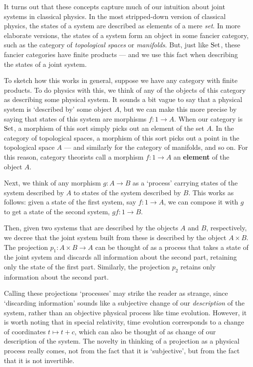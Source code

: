\documentclass[12pt]{article}
\newcommand{\Set}{{\rm Set}}
\renewcommand{\to}{\rightarrow}
\newcommand{\maps}{\colon}
\begin{document}
It turns out that these concepts capture much of our intuition about
joint systems in classical physics.  In the most stripped-down version
of classical physics, the states of a system are described as elements
of a mere {\it set}.  In more elaborate versions, the states of a
system form an object in some fancier category, such as the category
of {\it topological spaces} or {\it manifolds}.  But, just like
$\Set$, these fancier categories have finite products --- and we use
this fact when describing the states of a joint system.

To sketch how this works in general, suppose we have any category with
finite products.  To do physics with this, we think of any of the
objects of this category as describing some physical system.  It
sounds a bit vague to say that a physical system is `described by'
some object $A$, but we can make this more precise by saying that
states of this system are morphisms $f \maps 1 \to A$.  When our
category is $\Set$, a morphism of this sort simply picks out an
element of the set $A$.  In the category of topological spaces, a
morphism of this sort picks out a point in the topological space $A$
--- and similarly for the category of manifolds, and so on.  For this
reason, category theorists call a morphism $f \maps 1 \to A$ an {\bf
element} of the object $A$.  

Next, we think of any morphism $g \maps A \to B$ as a `process' carrying 
states of the system described by $A$ to states of the system described 
by $B$.  This works as follows: given a state of the first system, 
say $f \maps 1 \to A$, we can compose it with $g$ to get a state of
the second system, $gf \maps 1 \to B$.

Then, given two systems that are described by the objects $A$ and $B$,
respectively, we decree that the joint system built from these is
described by the object $A \times B$.  The projection $p_1 \maps A
\times B \to A$ can be thought of as a process that takes a state of
the joint system and discards all information about the second part,
retaining only the state of the first part.  Similarly, the projection
$p_2$ retains only information about the second part.  

Calling these projections `processes' may strike the reader as
strange, since `discarding information' sounds like a subjective
change of our {\it description} of the system, rather than an
objective physical process like time evolution.  However, it is worth
noting that in special relativity, time evolution corresponds to a
change of coordinates $t \mapsto t + c$, which can also be thought of
as change of our description of the system.  The novelty in thinking
of a projection as a physical process really comes, not from the fact
that it is `subjective', but from the fact that it is not invertible.
\end{document}
